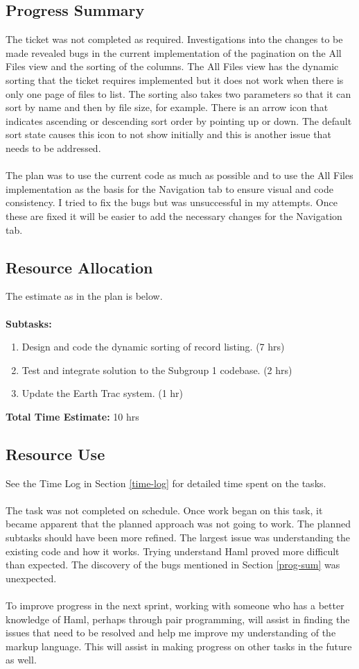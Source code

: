 \documentclass[10pt,a4,oneside]{article}
\begin{document}
\subsection*{Progress Summary}
\label{prog-sum}
The ticket was not completed as required. Investigations into the changes to be made revealed bugs in the current implementation of the pagination on the All Files view and the sorting of the columns. The All Files view has the dynamic sorting that the ticket requires implemented but it does not work when there is only one page of files to list. The sorting also takes two parameters so that it can sort by name and then by file size, for example. There is an arrow icon that indicates ascending or descending sort order by pointing up or down. The default sort state causes this icon to not show initially and this is another issue that needs to be addressed.\\
\\
The plan was to use the current code as much as possible and to use the All Files implementation as the basis for the Navigation tab to ensure visual and code consistency. I tried to fix the bugs but was unsuccessful in my attempts. Once these are fixed it will be easier to add the necessary changes for the Navigation tab.

\subsection*{Resource Allocation}
The estimate as in the plan is below.\\
\\
\textbf{Subtasks:}
\begin{enumerate}
	\item Design and code the dynamic sorting of record listing. (7 hrs)
	\item Test and integrate solution to the Subgroup 1 codebase. (2 hrs)
	\item Update the Earth Trac system. (1 hr)
\end{enumerate}
\textbf{Total Time Estimate:} 10 hrs

\subsection*{Resource Use}
See the Time Log in Section \ref{time-log} for detailed time spent on the tasks.\\
\\
The task was not completed on schedule. Once work began on this task, it became apparent that the planned approach was not going to work. The planned subtasks should have been more refined. The largest issue was understanding the existing code and how it works. Trying understand Haml proved more difficult than expected. The discovery of the bugs mentioned in Section \ref{prog-sum} was unexpected.\\
\\
To improve progress in the next sprint, working with someone who has a better knowledge of Haml, perhaps through pair programming, will assist in finding the issues that need to be resolved and help me improve my understanding of the markup language. This will assist in making progress on other tasks in the future as well.
\end{document}
